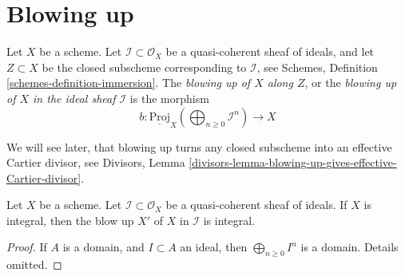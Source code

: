 \section{Blowing up}
\label{section-blowing-up}


\begin{definition}
\label{definition-blow-up}
Let $X$ be a scheme.
Let $\mathcal{I} \subset \mathcal{O}_X$ be a
quasi-coherent sheaf of ideals, and let $Z \subset X$
be the closed subscheme corresponding to $\mathcal{I}$,
see Schemes, Definition \ref{schemes-definition-immersion}.
The {\it blowing up of $X$ along $Z$}, or the
{\it blowing up of $X$ in the ideal sheaf $\mathcal{I}$} is
the morphism
$$
b :
\underline{\text{Proj}}_X
\left(\bigoplus\nolimits_{n \geq 0} \mathcal{I}^n\right)
\longrightarrow
X
$$
\end{definition}

\noindent
We will see later, that blowing up turns any closed subscheme into
an effective Cartier divisor, see
Divisors,
Lemma \ref{divisors-lemma-blowing-up-gives-effective-Cartier-divisor}.

\begin{lemma}
\label{lemma-blow-up-integral-scheme}
Let $X$ be a scheme. Let $\mathcal{I} \subset \mathcal{O}_X$ be a
quasi-coherent sheaf of ideals. If $X$ is integral, then the
blow up $X'$ of $X$ in $\mathcal{I}$ is integral.
\end{lemma}

\begin{proof}
If $A$ is a domain, and $I \subset A$ an ideal, then
$\bigoplus_{n \geq 0} I^n$ is a domain.
Details omitted.
\end{proof}












